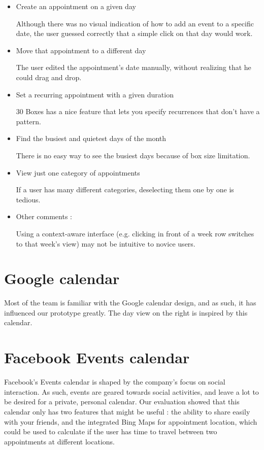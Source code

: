 \documentclass{article}
\begin{document}
\begin{itemize}
\item Create an appointment on a given day

Although there was no visual indication of how to add an event to a specific
date, the user guessed correctly that a simple click on that day would work.

\item Move that appointment to a different day

The user edited the appointment's date manually, without realizing that he
could drag and drop.

\item Set a recurring appointment with a given duration

30 Boxes has a nice feature that lets you specify recurrences that don't have
a pattern.

\item Find the busiest and quietest days of the month

There is no easy way to see the busiest days because of box size limitation.

\item View just one category of appointments

If a user has many different categories, deselecting them one by one is tedious.

\item Other comments :

Using a context-aware interface (e.g. clicking in front of a week row switches
to that week's view) may not be intuitive to novice users.

\end{itemize}

\section{Google calendar}

Most of the team is familiar with the Google calendar design, and as such, it 
has influenced our prototype greatly. The day view on the right is inspired by 
this calendar.

\section{Facebook Events calendar}

Facebook's Events calendar is shaped by the company's focus on social 
interaction. As such, events are geared towards social activities, and leave a 
lot to be desired for a private, personal calendar. Our evaluation showed that 
this calendar only has two features that might be useful : the ability to share 
easily with your friends, and the integrated Bing Maps for appointment location, 
which could be used to calculate if the user has time to travel between two 
appointments at different locations.
\end{document}
